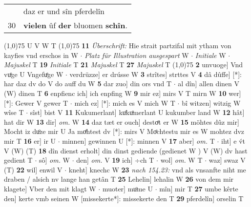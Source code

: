 \documentclass[8pt,a4paper,notitlepage]{article}
\begin{document}
\begin{table}[ht]
\begin{minipage}[t]{0.5\linewidth}
\begin{tabular}{rl}
 & daz er und sîn pferdelîn\\ 
30 & \textbf{vielen} ûf \textbf{der} bluomen \textbf{schîn}.\\ 
\end{tabular}
\scriptsize
\line(1,0){75} \newline
U V W T \newline
\line(1,0){75} \newline
\textbf{11} \textit{Überschrift:} Hie strait partzifal mit ytham von kayfies vnd erschos in W   $\cdot$ \textit{Platz für Illustration ausgespart} W   $\cdot$ \textit{Initiale} W   $\cdot$ \textit{Majuskel} T  \textbf{19} \textit{Initiale} T  \textbf{21} \textit{Majuskel} T  \textbf{27} \textit{Majuskel} T  \newline
\line(1,0){75} \newline
\textbf{2} unvuoge] Vnd vuͦge U Vngefuͤge W  $\cdot$ verdrüzze] er drússe W \textbf{3} strîtes] strttes V \textbf{4} dâ dûffe] [*]: har daz dv do V do auff du W \textbf{5} dar zuo] din ors vnd T  $\cdot$ al dîn] allen dinen V (W) dinen T \textbf{6} enpfienc ich] ich enpfing W \textbf{9} mir ez] mirs V T mirn W \textbf{10} wer] [*]: Gewer V gewer T  $\cdot$ mich ez] [*]: mich es V mich W T  $\cdot$ bî witzen] witzig W wîse T  $\cdot$ sîst] bist V \textbf{11} Kukumerlant] kuͦkuͦmerlant U kukumber land W \textbf{12} hât] hat dir W \textbf{13} dir] \textit{om.} W \textbf{14} daz tæt er ouch] destoͤt er W \textbf{15} möhtes dûz mir] Mocht iz duͦze mir U Ja moͤhtest dv [*]: mirs V Moͤchtestu mir es W mohtez dvz mir T \textbf{16} er] ir U  $\cdot$ minnen] gewinnen U [*]: minnen V \textbf{17} aber] \textit{om.} T  $\cdot$ iht] e v́t V (W) (T) \textbf{18} dîn dienst erholt] din dinst gediende (gedienet W ) V (W) dv hast gedient T  $\cdot$ sô] \textit{om.} W  $\cdot$ den] \textit{om.} V \textbf{19} ich] ÷ch T  $\cdot$ wol] \textit{om.} W T  $\cdot$ waz] swaz V (T) \textbf{22} wil] enwil V  $\cdot$ kneht] knechc W \textbf{23} \textit{nach 154.23:} vnd als vnsanfte niht me draben / alsich nv lange han getân T  \textbf{25} Lehelin] lehalin W \textbf{26} von dem mir klagete] Vber den mit klagt W  $\cdot$ muoter] muͦme U  $\cdot$ mîn] mir T \textbf{27} umbe kêrte den] kerte vmb seinen W [missekerte*]: missekerte den T \textbf{29} pferdelîn] orselin T \newline
\end{minipage}
\end{table}
\end{document}

